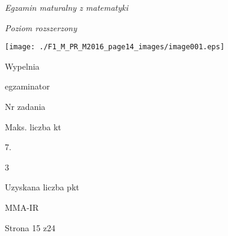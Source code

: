 \documentclass[a4paper,12pt]{article}
\begin{document}
{\it Egzamin maturalny z matematyki}

{\it Poziom rozszerzony}
\begin{center}
\texttt{[image: ./F1\_M\_PR\_M2016\_page14\_images/image001.eps]}
\end{center}
Wypelnia

egzaminator

Nr zadania

Maks. liczba kt

7.

3

Uzyskana liczba pkt

MMA-IR

Strona 15 z24
\end{document}
